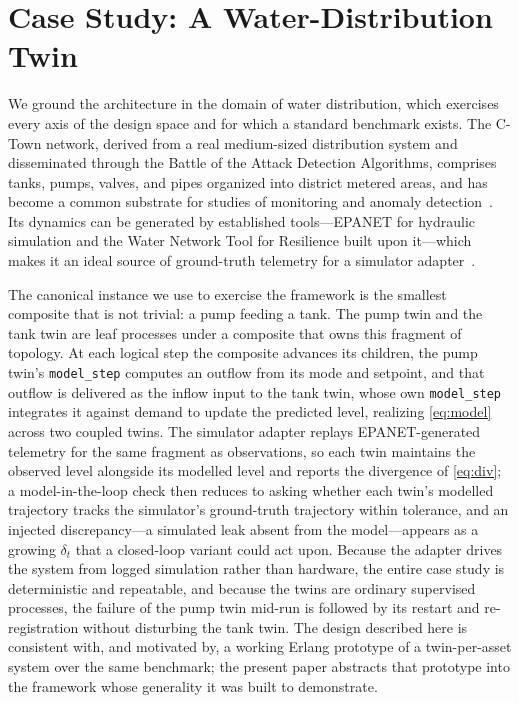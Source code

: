 \documentclass[conference]{IEEEtran}
\begin{document}
\section{Case Study: A Water-Distribution Twin}
\label{sec:case}
We ground the architecture in the domain of water distribution, which exercises
every axis of the design space and for which a standard benchmark exists. The
C-Town network, derived from a real medium-sized distribution system and
disseminated through the Battle of the Attack Detection Algorithms, comprises
tanks, pumps, valves, and pipes organized into district metered areas, and has
become a common substrate for studies of monitoring and anomaly
detection~\cite{ctown}. Its dynamics can be generated by established
tools---EPANET for hydraulic simulation and the Water Network Tool for
Resilience built upon it---which makes it an ideal source of ground-truth
telemetry for a simulator adapter~\cite{epanet,wntr}.

The canonical instance we use to exercise the framework is the smallest
composite that is not trivial: a pump feeding a tank. The pump twin and the tank
twin are leaf processes under a composite that owns this fragment of topology.
At each logical step the composite advances its children, the pump twin's
\texttt{model\_step} computes an outflow from its mode and setpoint, and that
outflow is delivered as the inflow input to the tank twin, whose own
\texttt{model\_step} integrates it against demand to update the predicted level,
realizing \eqref{eq:model} across two coupled twins. The simulator adapter
replays EPANET-generated telemetry for the same fragment as observations, so
each twin maintains the observed level alongside its modelled level and reports
the divergence of \eqref{eq:div}; a model-in-the-loop check then reduces to
asking whether each twin's modelled trajectory tracks the simulator's
ground-truth trajectory within tolerance, and an injected discrepancy---a
simulated leak absent from the model---appears as a growing $\delta_t$ that a
closed-loop variant could act upon. Because the adapter drives the system from
logged simulation rather than hardware, the entire case study is deterministic
and repeatable, and because the twins are ordinary supervised processes, the
failure of the pump twin mid-run is followed by its restart and re-registration
without disturbing the tank twin. The design described here is consistent with,
and motivated by, a working Erlang prototype of a twin-per-asset system over the
same benchmark; the present paper abstracts that prototype into the framework
whose generality it was built to demonstrate.
\end{document}
